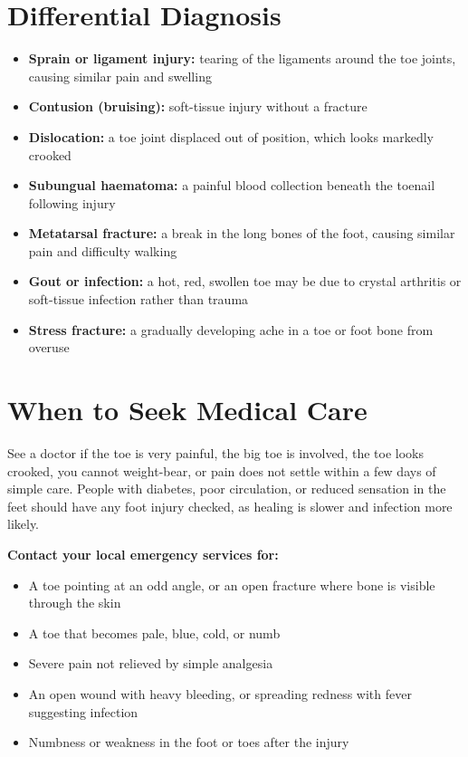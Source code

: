 \section*{Differential Diagnosis}
\begin{itemize}
    \item \textbf{Sprain or ligament injury:} tearing of the ligaments around the toe joints, causing similar pain and swelling
    \item \textbf{Contusion (bruising):} soft-tissue injury without a fracture
    \item \textbf{Dislocation:} a toe joint displaced out of position, which looks markedly crooked
    \item \textbf{Subungual haematoma:} a painful blood collection beneath the toenail following injury
    \item \textbf{Metatarsal fracture:} a break in the long bones of the foot, causing similar pain and difficulty walking
    \item \textbf{Gout or infection:} a hot, red, swollen toe may be due to crystal arthritis or soft-tissue infection rather than trauma
    \item \textbf{Stress fracture:} a gradually developing ache in a toe or foot bone from overuse
\end{itemize}

\section*{When to Seek Medical Care}
See a doctor if the toe is very painful, the big toe is involved, the toe looks crooked, you cannot weight-bear, or pain does not settle within a few days of simple care. People with diabetes, poor circulation, or reduced sensation in the feet should have any foot injury checked, as healing is slower and infection more likely.

\textbf{Contact your local emergency services for:}
\begin{itemize}
    \item A toe pointing at an odd angle, or an open fracture where bone is visible through the skin
    \item A toe that becomes pale, blue, cold, or numb
    \item Severe pain not relieved by simple analgesia
    \item An open wound with heavy bleeding, or spreading redness with fever suggesting infection
    \item Numbness or weakness in the foot or toes after the injury
\end{itemize}

